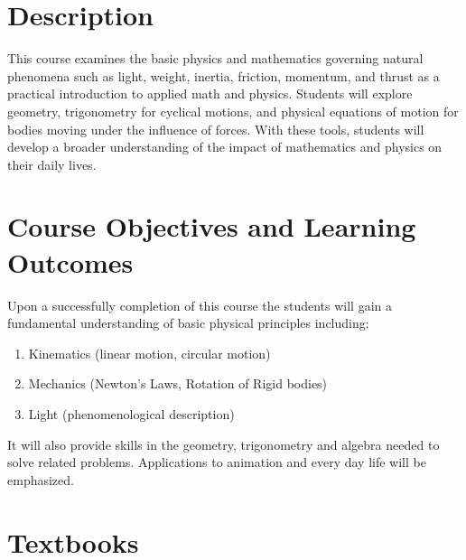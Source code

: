 \documentclass[12pt]{article}
\begin{document}


\section*{Description}

This course examines the basic physics and mathematics governing natural phenomena such
as light, weight, inertia, friction, momentum, and thrust as a practical introduction to
applied math and physics. Students will explore geometry, trigonometry for cyclical motions,
and physical equations of motion for bodies moving under the influence of forces. With
these tools, students will develop a broader understanding of the impact of mathematics
and physics on their daily lives.




\section*{Course Objectives and Learning Outcomes }
Upon a successfully completion of this course the students will gain a fundamental understanding of basic physical principles including:

\begin{enumerate}
\item Kinematics (linear motion, circular motion)
\item Mechanics (Newton's Laws, Rotation of Rigid bodies)
\item Light (phenomenological description)
\end{enumerate}


It will also provide skills in the geometry, trigonometry and algebra needed to
solve related problems. Applications to animation and every day life will be emphasized.


\section*{Textbooks}
\end{document}
